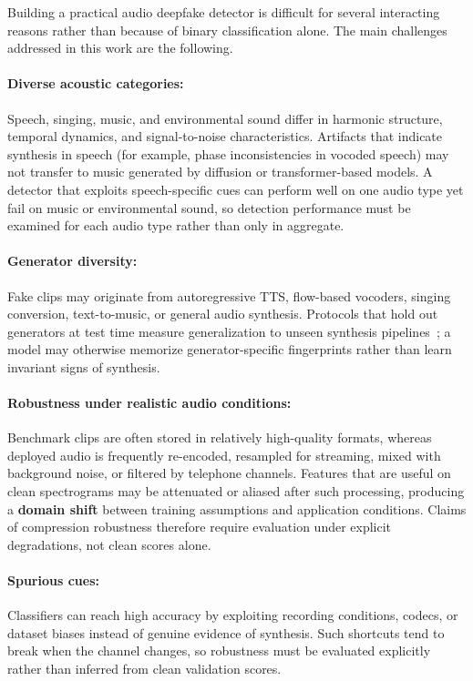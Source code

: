 Building a practical audio deepfake detector is difficult for several interacting reasons rather than because of binary classification alone. The main challenges addressed in this work are the following.

\paragraph{Diverse acoustic categories:} Speech, singing, music, and environmental sound differ in harmonic structure, temporal dynamics, and signal-to-noise characteristics. Artifacts that indicate synthesis in speech (for example, phase inconsistencies in vocoded speech) may not transfer to music generated by diffusion or transformer-based models. A detector that exploits speech-specific cues can perform well on one audio type yet fail on music or environmental sound, so detection performance must be examined for each audio type rather than only in aggregate.

\paragraph{Generator diversity:} Fake clips may originate from autoregressive TTS, flow-based vocoders, singing conversion, text-to-music, or general audio synthesis. Protocols that hold out generators at test time measure generalization to unseen synthesis pipelines~\cite{xie2026atadd}; a model may otherwise memorize generator-specific fingerprints rather than learn invariant signs of synthesis.

\paragraph{Robustness under realistic audio conditions:} Benchmark clips are often stored in relatively high-quality formats, whereas deployed audio is frequently re-encoded, resampled for streaming, mixed with background noise, or filtered by telephone channels. Features that are useful on clean spectrograms may be attenuated or aliased after such processing, producing a \textbf{domain shift} between training assumptions and application conditions. Claims of compression robustness therefore require evaluation under explicit degradations, not clean scores alone.

\paragraph{Spurious cues:} Classifiers can reach high accuracy by exploiting recording conditions, codecs, or dataset biases instead of genuine evidence of synthesis. Such shortcuts tend to break when the channel changes, so robustness must be evaluated explicitly rather than inferred from clean validation scores.


